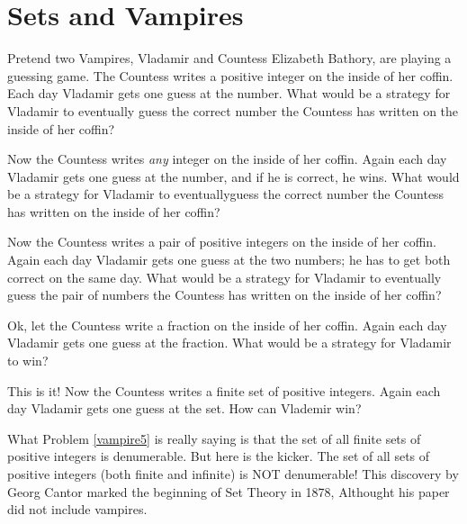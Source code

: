\section{Sets and Vampires}

\begin{problem} 
Pretend two Vampires, Vladamir and  Countess Elizabeth Bathory, are playing a guessing game.  The Countess writes a positive integer on the inside of her coffin.  Each day Vladamir gets one guess at the number.  What would be a strategy for Vladamir to eventually guess the correct number the Countess has written on the inside of her coffin?
\end{problem}
\begin{problem}
Now the Countess writes \emph{any} integer on the inside of her coffin.  Again each day Vladamir gets one guess at the number, and if he is correct, he wins.  What would be a strategy for Vladamir to eventuallyguess the correct number the Countess has written on the inside of her coffin?
\end{problem}

\begin{problem}
Now the Countess writes a pair of positive integers on the inside of her coffin.  Again each day Vladamir gets one guess at the two numbers; he has to get both correct on the same day.  What would be a strategy for Vladamir to eventually guess the pair of numbers the Countess has written on the inside of her coffin?
\end{problem}

\newpage
\begin{problem}
Ok, let the Countess write a fraction on the inside of her coffin.  Again each day Vladamir gets one guess at the fraction.  What would be a strategy for Vladamir to win?
\end{problem}

\begin{problem}
This is it!   Now the Countess writes a finite set of positive integers.  Again each day Vladamir gets one guess at the set.  How can Vlademir win? 
\label{vampire5}
\end{problem}

What Problem \ref{vampire5} is really saying is that the set of all finite sets of positive integers is denumerable.  But here is the kicker.  The set of all sets of positive integers (both finite and infinite) is NOT denumerable!  This discovery by Georg Cantor marked the beginning of Set Theory in 1878, Althought his paper did not include vampires.

